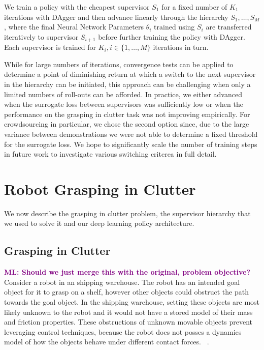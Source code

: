 \documentclass[10pt, conference]{ieeeconf}      %
\newcommand{\mlnote}[1]{\ifthenelse{ \boolean{include-notes}}%
 {\textcolor{purple}{\textbf{ML: #1}}}{}}
\begin{document}
We train a policy with the cheapest supervisor $S_1$ for a fixed number of $K_1$ iterations with DAgger and then advance
linearly through the hierarchy $S_1, \ldots, S_M$, where the final Neural Network Parameters $\theta_i$ trained using
$S_i$ are transferred iteratively to supervisor $S_{i+1}$ before further training the policy with DAgger.
Each supervisor is trained for $K_i, i\in \{1, \ldots, M\}$ iterations in turn. 

While for large numbers of iterations, convergence tests can be applied to determine a point of diminishing return at
which a switch to the next supervisor in the hierarchy can be initiated, this approach can be challenging when only a
limited numbers of roll-outs can be afforded. In practice, we either advanced when the surrogate loss between
supervisors was sufficiently low or when the performance on the grasping in clutter task was not improving empirically. 
For crowdsourcing in particular, we chose the second option since, due to the large variance between demonstrations
we were not able to determine a fixed threshold for the surrogate loss. We hope to significantly scale the number of
training steps in future work to investigate various switching criterea in full detail.




\section{Robot Grasping in Clutter}
We now describe the grasping in clutter problem, the supervisor hierarchy that we used to solve it and our deep learning policy architecture. 

\subsection{Grasping in Clutter}\label{sec:task}
\mlnote{Should we just merge this with the original, problem objective?}
Consider a robot in an shipping warehouse. The robot has an intended goal object for it to grasp on a shelf, however other objects could obstruct the path towards the goal object. In the shipping warehouse, setting these objects are most likely unknown to the robot and it would not have a stored model of their mass and friction properties. These obstructions of unknown  movable objects prevent leveraging  control techniques, because the robot does not posses a dynamics model of how the objects behave under different contact forces. ~\cite{kitaevphysics,kingnonprehensile}.
\end{document}
